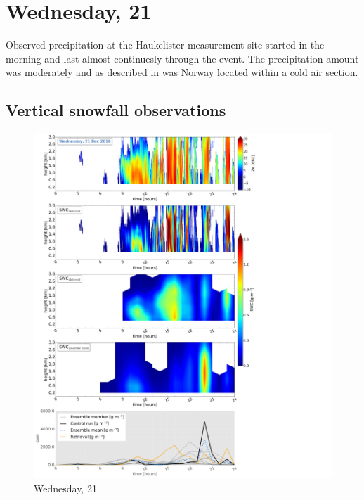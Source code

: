 \section{Wednesday, \SI{21}{\dec}}
Observed precipitation at the Haukelister measurement site started in the morning and last almost continuesly through the event. The precipitation amount was moderately and as described in  was Norway located within a cold air section. 

\subsection{Vertical snowfall observations}
\begin{figure}[h]
	\includegraphics[trim={0.5cm 0.5cm 17.5cm .5cm},clip,width=\textwidth]{./fig_SWC/20161221}
	\caption{Wednesday, \SI{21}{\dec}}\label{fig:SWC21}
\end{figure}
